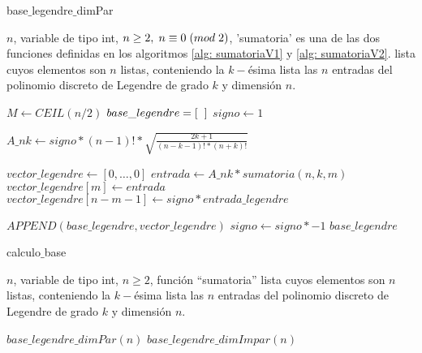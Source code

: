 \begin{algorithm}
\caption{base$\_$legendre$\_$dimPar}\label{alg: legendre par}
\begin{algorithmic} [1]
\REQUIRE $n$, variable de tipo int, $n \geq 2, \hspace{0.1cm} n \equiv 0 \hspace{0.1cm} (mod \hspace{0.1cm} 2)$, 'sumatoria' es una de las dos funciones definidas en los algoritmos
\ref{alg: sumatoriaV1} y \ref{alg: sumatoriaV2}.
\ENSURE lista cuyos elementos son $n$ listas, conteniendo
la $k-$ésima lista las $n$ entradas del polinomio discreto de Legendre de
grado $k$ y dimensión $n$.


\STATE $M \leftarrow CEIL(n/2)$
\STATE $base\_legendre=[ \hspace{0.2cm} ]$ 
\STATE $signo \leftarrow 1$ 

\STATE $A\_nk \leftarrow signo * (n-1)!*
\sqrt{\frac{
2k+1
}{
(n-k-1)!*(n+k)!
}}$

\STATE $vector\_legendre \leftarrow [ 0, \ldots , 0]$  
\STATE $entrada \leftarrow A\_nk * sumatoria(n,k,m)$
\STATE $vector\_legendre[m] \leftarrow entrada$ 
\STATE $vector\_legendre[n-m-1] \leftarrow signo *entrada\_legendre$
\ENDFOR

\STATE $APPEND(base\_legendre, vector\_legendre)$
\STATE $signo \leftarrow signo * -1$
\ENDFOR
\RETURN $base\_legendre$
\end{algorithmic}
\end{algorithm}



\begin{algorithm}
\caption{calculo$\_$base}\label{alg: legendre}
\begin{algorithmic} [1]
\REQUIRE $n$, variable de tipo int, $n \geq 2$, función ``sumatoria''
\ENSURE lista cuyos elementos son $n$ listas, conteniendo
la $k-$ésima lista las $n$ entradas del polinomio discreto de Legendre de
grado $k$ y dimensión $n$.

\STATE $base\_legendre\_dimPar(n)$
\ELSE
\STATE $base\_legendre\_dimImpar(n)$
\ENDIF
\end{algorithmic}
\end{algorithm}


